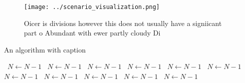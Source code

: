 \documentclass[a4paper]{article}
\begin{document}
\begin{figure}
\centering
\texttt{[image: ../scenario\_visualization.png]}
\caption{Oicer is divisions however this does not usually have a signiicant part o Abundant with ewer partly cloudy Di
}
\end{figure}
 
\begin{algorithm}
\caption{An algorithm with caption}
\begin{algorithmic}
\    \State $N \gets N - 1$
\    \State $N \gets N - 1$
\    \State $N \gets N - 1$
\    \State $N \gets N - 1$
\    \State $N \gets N - 1$
\    \State $N \gets N - 1$
\    \State $N \gets N - 1$
\    \State $N \gets N - 1$
\    \State $N \gets N - 1$
\    \State $N \gets N - 1$
\    \State $N \gets N - 1$
\EndWhile
\end{algorithmic}
\end{algorithm}
\end{document}

